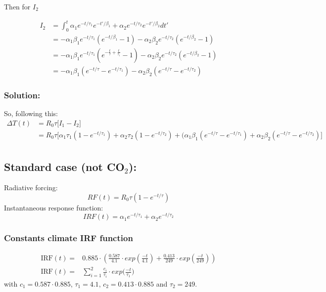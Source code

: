 \documentclass[11pt]{article}
\begin{document}
    Then for \(I_2\)

    \begin{align*} 
I_2 & =  \int_0^t \alpha_1 e^{-t/\tau_1}e^{-t'/\beta_1} + \alpha_2e^{-t/\tau_2}  e^{-t'/\beta_2} dt'\\
&= -\alpha_1\beta_1e^{-t/\tau_1}(e^{-t/\beta_1}-1)- \alpha_2\beta_2e^{-t/\tau_2}(e^{-t/\beta_2}-1)\\
&= -\alpha_1\beta_1e^{-t/\tau_1}(e^{-\frac{t}{\tau}+\frac{t}{\tau_i}}-1)- \alpha_2\beta_2e^{-t/\tau_2}(e^{-t/\beta_2}-1)\\
&= -\alpha_1\beta_1(e^{-t/\tau} -e^{-t/\tau_1})- \alpha_2\beta_2(e^{-t/\tau} -e^{-t/\tau_2}) 
\end{align*}

    \hypertarget{solution}{%
\subsubsection{Solution:}\label{solution}}

So, following this: \begin{align*} 
\Delta T (t) &=R_0\tau \Big[ I_1 - I_2\Big] \\
& = R_0\tau \Big[\alpha_1\tau_1(1-e^{-t/\tau_1}) + \alpha_2 \tau_2(1 - e^{-t/\tau_2}) + \big( \alpha_1\beta_1(e^{-t/\tau} -e^{-t/\tau_1})+ \alpha_2\beta_2(e^{-t/\tau} -e^{-t/\tau_2})     \Big] \\
\end{align*}

    \hypertarget{standard-case-not-co_2}{%
\subsection{\texorpdfstring{Standard case (not
CO\(_2\)):}{Standard case (not CO\_2):}}\label{standard-case-not-co_2}}

Radiative forcing: \[
RF(t) = R_0 \tau (1-e^{-t/\tau})
\] Instantaneous response function: \[
IRF(t) = \alpha_1 e^{-t/\tau_1}+\alpha_2 e^{-t/\tau_2}
\]

    \hypertarget{constants-climate-irf-function}{%
\subsubsection{Constants climate IRF
function}\label{constants-climate-irf-function}}

    \begin{align*}
\text{IRF}(t)=& 0.885\cdot (\frac{0.587}{4.1}\cdot exp(\frac{-t}{4.1}) + \frac{0.413}{249} \cdot exp(\frac{-t}{249}))\\ 
\text{IRF}(t)= &  \sum_{i=1}^2\frac{c_i}{
\tau_i}\cdot exp\big(\frac{-t}{\tau_1}\big) \end{align*} with
\(c_1=0.587\cdot 0.885\), \(\tau_1=4.1\), \(c_2=0.413\cdot 0.885\) and
\(\tau_2 = 249\).
\end{document}

